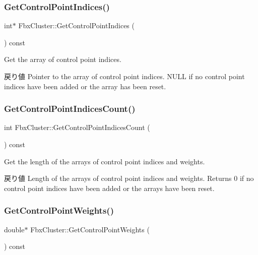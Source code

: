 \subsubsection{\texorpdfstring{Get\+Control\+Point\+Indices()}{GetControlPointIndices()}}
{\footnotesize\ttfamily int$\ast$ Fbx\+Cluster\+::\+Get\+Control\+Point\+Indices (\begin{DoxyParamCaption}{ }\end{DoxyParamCaption}) const}

Get the array of control point indices. \begin{DoxyReturn}{戻り値}
Pointer to the array of control point indices. {\ttfamily N\+U\+LL} if no control point indices have been added or the array has been reset. 
\end{DoxyReturn}
\mbox{\label{class_fbx_cluster_a93949165294ced9468d5a848171602f9}} 
\subsubsection{\texorpdfstring{Get\+Control\+Point\+Indices\+Count()}{GetControlPointIndicesCount()}}
{\footnotesize\ttfamily int Fbx\+Cluster\+::\+Get\+Control\+Point\+Indices\+Count (\begin{DoxyParamCaption}{ }\end{DoxyParamCaption}) const}

Get the length of the arrays of control point indices and weights. \begin{DoxyReturn}{戻り値}
Length of the arrays of control point indices and weights. Returns 0 if no control point indices have been added or the arrays have been reset. 
\end{DoxyReturn}
\mbox{\label{class_fbx_cluster_a5d42ec34a7b76844170492a3caaa1171}} 
\subsubsection{\texorpdfstring{Get\+Control\+Point\+Weights()}{GetControlPointWeights()}}
{\footnotesize\ttfamily double$\ast$ Fbx\+Cluster\+::\+Get\+Control\+Point\+Weights (\begin{DoxyParamCaption}{ }\end{DoxyParamCaption}) const}

